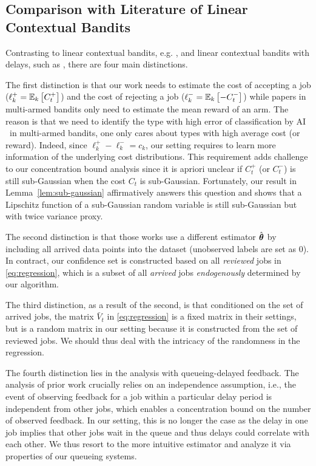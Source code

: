 \subsection{Comparison with Literature of Linear Contextual Bandits}\label{app:comparison}
Contrasting to  linear contextual bandits, e.g. \cite{Abbasi-YadkoriPS11}, and linear contextual bandits with delays, such as \cite{VernadeCP17,blanchet2023delay}, there are four main distinctions.

The first distinction is that our work needs to estimate the cost of accepting a job ($\ell_k^+ = \mathbb E_{k}\left[C_t^+\right]$) and the cost of rejecting a job ($\ell_k^- = \mathbb E_{k}\left[-C_t^-\right]$) while papers in multi-armed bandits only need to estimate the mean reward of an arm. The reason is that we need to identify the type with high error of classification by AI \textemdash ~in multi-armed bandits, one only cares about types with high average cost (or reward). Indeed, since $\ell_k^+ - \ell_k^- = c_k$, our setting requires to learn more information of the underlying cost distributions. This requirement adds challenge to our concentration bound analysis since it is apriori unclear if $C_t^+$ (or $C_t^-$) is still sub-Gaussian when the cost $C_t$ is sub-Gaussian. Fortunately, our result in Lemma~\ref{lem:sub-gaussian} affirmatively answers this question and shows that a Lipschitz function of a sub-Gaussian random variable is still sub-Gaussian but with twice variance proxy.

The second distinction is that those works use a different estimator $\hat{\boldsymbol{\theta}}$ by including all arrived data points into the dataset (unobserved labels are set as $0$). In contract, our confidence set is constructed based on all \emph{reviewed} jobs in \eqref{eq:regression}, which is a subset of all \emph{arrived} jobs \emph{endogenously} determined by our algorithm. 

The third distinction, as a result of the second, is that conditioned on the set of arrived jobs, the matrix $\bar{V}_t$ in \eqref{eq:regression} is a fixed matrix in their settings, but is a random matrix in our setting because it is constructed from the set of reviewed jobs. We should thus deal with the intricacy of the randomness in the regression.

The fourth distinction lies in the analysis with queueing-delayed feedback.  The analysis of prior work crucially relies on an independence assumption, i.e., the event of observing feedback for a job within a particular delay period is independent from other jobs, which enables a concentration bound on the number of observed feedback.  In our setting, this is no longer the case as the delay in one job implies that other jobs wait in the queue and thus delays could correlate with each other. We thus resort to the more intuitive estimator and analyze it via properties of our queueing systems. 

